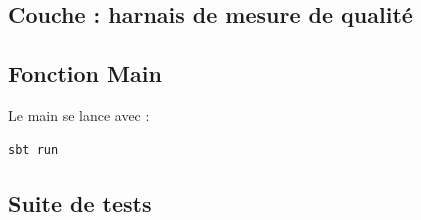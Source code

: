 

\subsection{Couche  : harnais de mesure de qualité}



\subsection{Fonction Main}
\label{sec:appendix-main}

Le main se lance avec :

\begin{lstlisting}[language=bash, basicstyle=\ttfamily\small]
sbt run
\end{lstlisting}



\subsection{Suite de tests}









